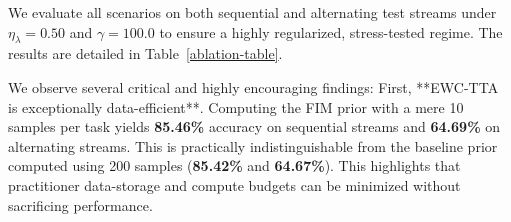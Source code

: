 \documentclass{article}
\theoremstyle{plain}
\theoremstyle{definition}
\theoremstyle{remark}
\begin{document}
We evaluate all scenarios on both sequential and alternating test streams under $\eta_\lambda=0.50$ and $\gamma=100.0$ to ensure a highly regularized, stress-tested regime. The results are detailed in Table~\ref{ablation-table}.

\begin{table}[h]
\caption{Ablation of Fisher Information Matrix (FIM) prior quality on sequential and alternating test streams under $\eta_\lambda=0.50$ and $\gamma=100.0$. Even under extreme sample scarcity ($N=10$) or complete absence of original training data (Synthetic/Noise), EWC-TTA maintains near-optimal performance, dramatically outperforming the uniform L2-TTA baseline.}
\label{ablation-table}
\vskip 0.05in
\begin{center}
\begin{small}
\begin{sc}
\end{sc}
\end{small}
\end{center}
\vskip -0.15in
\end{table}

We observe several critical and highly encouraging findings:
First, **EWC-TTA is exceptionally data-efficient**. Computing the FIM prior with a mere 10 samples per task yields \textbf{85.46\%} accuracy on sequential streams and \textbf{64.69\%} on alternating streams. This is practically indistinguishable from the baseline prior computed using 200 samples (\textbf{85.42\%} and \textbf{64.67\%}). This highlights that practitioner data-storage and compute budgets can be minimized without sacrificing performance.
\end{document}
